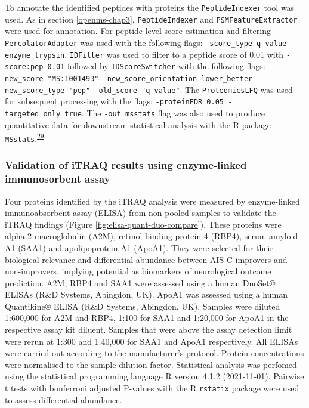 \documentclass[
]{article}
\begin{document}
To annotate the identified peptides with proteins the \texttt{PeptideIndexer} tool was used.
As in section \ref{openms-chap3}, \texttt{PeptideIndexer} and \texttt{PSMFeatureExtractor} were used for annotation.
For peptide level score estimation and filtering \texttt{PercolatorAdapter} was used with the following flags: \texttt{-score\_type\ q-value\ -enzyme\ trypsin}.
\texttt{IDFilter} was used to filter to a peptide score of 0.01 with \texttt{-score:pep\ 0.01} followed by \texttt{IDScoreSwitcher} with the following flags: \texttt{-new\_score\ "MS:1001493"\ -new\_score\_orientation\ lower\_better\ -new\_score\_type\ "pep"\ -old\_score\ "q-value"}.
The \texttt{ProteomicsLFQ} was used for subsequent processing with the flags: \texttt{-proteinFDR\ 0.05\ -targeted\_only\ true}.
The \texttt{-out\_msstats} flag was also used to produce quantitative data for downstream statistical analysis with the R package \texttt{MSstats}.\textsuperscript{\protect\hyperlink{ref-choi_msstats_2014}{29}}

\clearpage

\hypertarget{validation-of-itraq-results-using-enzyme-linked-immunosorbent-assay}{%
\subsubsection{Validation of iTRAQ results using enzyme-linked immunosorbent assay}\label{validation-of-itraq-results-using-enzyme-linked-immunosorbent-assay}}

Four proteins identified by the iTRAQ analysis were measured by enzyme-linked immunoabsorbent assay (ELISA) from non-pooled samples to validate the iTRAQ findings (Figure \ref{fig:elisa-quant-duo-compare}).
These proteins were alpha-2-macroglobulin (A2M), retinol binding protein 4 (RBP4), serum amyloid A1 (SAA1) and apolipoprotein A1 (ApoA1).
They were selected for their biological relevance and differential abundance between AIS C improvers and non-improvers, implying potential as biomarkers of neurological outcome prediction.
A2M, RBP4 and SAA1 were assessed using a human DuoSet® ELISAs (R\&D Systems, Abingdon, UK).
ApoA1 was assessed using a human Quantikine® ELISA (R\&D Systems, Abingdon, UK).
Samples were diluted 1:600,000 for A2M and RBP4, 1:100 for SAA1 and 1:20,000 for ApoA1 in the respective assay kit diluent.
Samples that were above the assay detection limit were rerun at 1:300 and 1:40,000 for SAA1 and ApoA1 respectively.
All ELISAs were carried out according to the manufacturer's protocol.
Protein concentrations were normalised to the sample dilution factor.
Statistical analysis was perfomed using the statistical programming language R version 4.1.2 (2021-11-01).
Pairwise t tests with bonferroni adjusted P-values with the R \texttt{rstatix} package were used to assess differential abundance.
\end{document}
